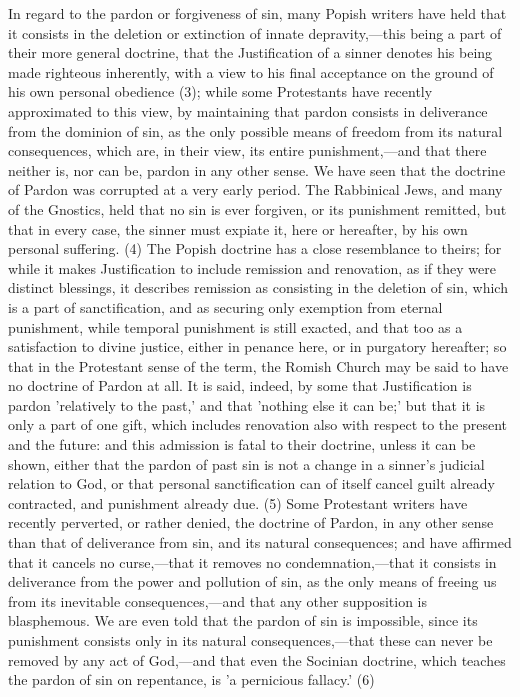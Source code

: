 \documentclass[
]{book}
\begin{document}
In regard to the pardon or forgiveness of sin, many Popish writers have held that it consists in the deletion or extinction of innate depravity,---this being a part of their more general doctrine, that the Justification of a sinner denotes his being made righteous inherently, with a view to his final acceptance on the ground of his own personal obedience (3); while some Protestants have recently approximated to this view, by maintaining that pardon consists in deliverance from the dominion of sin, as the only possible means of freedom from its natural consequences, which are, in their view, its entire punishment,---and that there neither is, nor can be, pardon in any other sense. We have seen that the doctrine of Pardon was corrupted at a very early period. The Rabbinical Jews, and many of the Gnostics, held that no sin is ever forgiven, or its punishment remitted, but that in every case, the sinner must expiate it, here or hereafter, by his own personal suffering. (4) The Popish doctrine has a close resemblance to theirs; for while it makes Justification to include remission and renovation, as if they were distinct blessings, it describes remission as consisting in the deletion of sin, which is a part of sanctification, and as securing only exemption from eternal punishment, while temporal punishment is still exacted, and that too as a satisfaction to divine justice, either in penance here, or in purgatory hereafter; so that in the Protestant sense of the term, the Romish Church may be said to have no doctrine of Pardon at all. It is said, indeed, by some that Justification is pardon 'relatively to the past,' and that 'nothing else it can be;' but that it is only a part of one gift, which includes renovation also with respect to the present and the future: and this admission is fatal to their doctrine, unless it can be shown, either that the pardon of past sin is not a change in a sinner's judicial relation to God, or that personal sanctification can of itself cancel guilt already contracted, and punishment already due. (5) Some Protestant writers have recently perverted, or rather denied, the doctrine of Pardon, in any other sense than that of deliverance from sin, and its natural consequences; and have affirmed that it cancels no curse,---that it removes no condemnation,---that it consists in deliverance from the power and pollution of sin, as the only means of freeing us from its inevitable consequences,---and that any other supposition is blasphemous. We are even told that the pardon of sin is impossible, since its punishment consists only in its natural consequences,---that these can never be removed by any act of God,---and that even the Socinian doctrine, which teaches the pardon of sin on repentance, is 'a pernicious fallacy.' (6)
\end{document}
